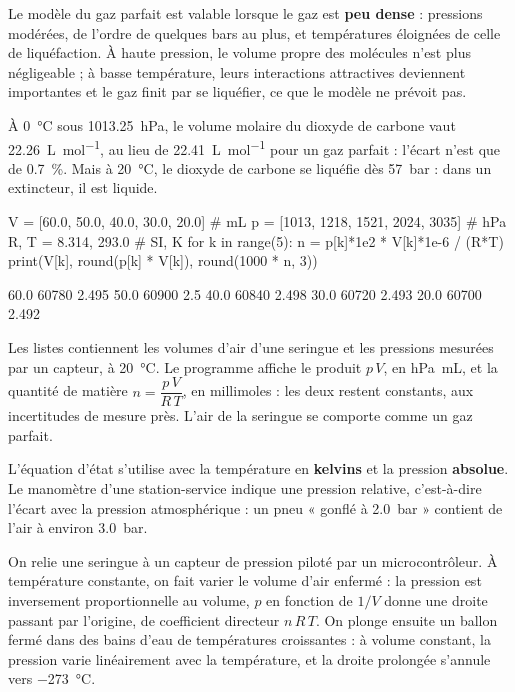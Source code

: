 \begin{propriete}
Le modèle du gaz parfait est valable lorsque le gaz est \textbf{peu dense} : pressions modérées, de l'ordre de
quelques bars au plus, et températures éloignées de celle de liquéfaction. À haute pression, le volume propre des
molécules n'est plus négligeable ; à basse température, leurs interactions attractives deviennent importantes et le
gaz finit par se liquéfier, ce que le modèle ne prévoit pas.
\end{propriete}
\begin{exemple}
À \qty{0}{\degreeCelsius} sous \qty{1013,25}{hPa}, le volume molaire du dioxyde de carbone vaut \qty{22,26}{L.mol^{-1}}, au lieu de
\qty{22,41}{L.mol^{-1}} pour un gaz parfait : l'écart n'est que de \qty{0,7}{\percent}. Mais à \qty{20}{\degreeCelsius}, le
dioxyde de carbone se liquéfie dès \qty{57}{bar} : dans un extincteur, il est liquide.
\end{exemple}
\begin{codecote}[0.6]
\begin{pythoncol}
V = [60.0, 50.0, 40.0, 30.0, 20.0]   # mL
p = [1013, 1218, 1521, 2024, 3035]   # hPa
R, T = 8.314, 293.0                  # SI, K
for k in range(5):
    n = p[k]*1e2 * V[k]*1e-6 / (R*T)
    print(V[k], round(p[k] * V[k]),
          round(1000 * n, 3))
\end{pythoncol}
\begin{consolecol}
60.0 60780 2.495
50.0 60900 2.5
40.0 60840 2.498
30.0 60720 2.493
20.0 60700 2.492
\end{consolecol}
\cote
\fontsize{9.5}{12.5}\selectfont
{}\par\smallskip
Les listes contiennent les volumes d'air d'une seringue et les pressions mesurées par un capteur, à
\qty{20}{\degreeCelsius}. Le programme affiche le produit $p\,V$, en \unit{hPa.mL}, et la quantité de matière
$n=\dfrac{p\,V}{R\,T}$, en millimoles : les deux restent constants, aux incertitudes de mesure près. L'air de la seringue
se comporte comme un gaz parfait.
\end{codecote}
\begin{attention}
L'équation d'état s'utilise avec la température en \textbf{kelvins} et la pression \textbf{absolue}. Le manomètre d'une
station-service indique une pression relative, c'est-à-dire l'écart avec la pression atmosphérique : un pneu « gonflé à
\qty{2,0}{bar} » contient de l'air à environ \qty{3,0}{bar}.
\end{attention}
\begin{experience}
On relie une seringue à un capteur de pression piloté par un microcontrôleur. À température constante, on fait varier
le volume d'air enfermé : la pression est inversement proportionnelle au volume, $p$ en fonction de $1/V$ donne une
droite passant par l'origine, de coefficient directeur $n\,R\,T$. On plonge ensuite un ballon fermé dans des bains d'eau
de températures croissantes : à volume constant, la pression varie linéairement avec la température, et la droite
prolongée s'annule vers \qty{-273}{\degreeCelsius}.
\end{experience}
